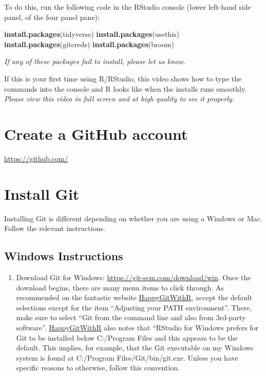 \documentclass[
]{book}
\newenvironment{Shaded}{\begin{snugshade}}{\end{snugshade}}
\newcommand{\FunctionTok}[1]{\textcolor[rgb]{0.13,0.29,0.53}{\textbf{#1}}}
\newcommand{\NormalTok}[1]{#1}
\newcommand{\StringTok}[1]{\textcolor[rgb]{0.31,0.60,0.02}{#1}}
\providecommand{\tightlist}{%
  \setlength{\itemsep}{0pt}\setlength{\parskip}{0pt}}
\begin{document}
To do this, run the following code in the RStudio console (lower left-hand side
panel, of the four panel pane):

\begin{Shaded}
\begin{Highlighting}[]
\FunctionTok{install.packages}\NormalTok{(}\StringTok{\textquotesingle{}tidyverse\textquotesingle{}}\NormalTok{)}
\FunctionTok{install.packages}\NormalTok{(}\StringTok{\textquotesingle{}usethis\textquotesingle{}}\NormalTok{)}
\FunctionTok{install.packages}\NormalTok{(}\StringTok{\textquotesingle{}gitcreds\textquotesingle{}}\NormalTok{)}
\FunctionTok{install.packages}\NormalTok{(}\StringTok{\textquotesingle{}broom\textquotesingle{}}\NormalTok{)}
\end{Highlighting}
\end{Shaded}

\emph{If any of these packages fail to install, please let us know.}

If this is your first time using R/RStudio, this video shows how to type the
commands into the console and R looks like when the installs runs smoothly.
\emph{Please view this video in full screen and at high quality to see it properly.}

\section{Create a GitHub account}\label{create-a-github-account}

\url{https://github.com/}

\section{Install Git}\label{install-git}

Installing Git is different depending on whether you are using a Windows or Mac.
Follow the relevant instructions.

\subsection{Windows Instructions}\label{windows-instructions}

\begin{enumerate}
\def\labelenumi{\arabic{enumi})}
\tightlist
\item
  Download Git for Windows: \url{https://git-scm.com/download/win}. Once the download
  begins, there are many menu items to click through. As recommended on the
  fantastic website \href{https://happygitwithr.com/install-git}{HappyGitWithR}, accept
  the default selections except for the item ``Adjusting your PATH environment''.
  There, make sure to select ``Git from the command line and also from 3rd-party
  software''. \href{https://happygitwithr.com/install-git}{HappyGitWithR} also notes
  that ``RStudio for Windows prefers for Git to
  be installed below C:/Program Files and this appears to be the default. This
  implies, for example, that the Git executable on my Windows system is found at
  C:/Program Files/Git/bin/git.exe. Unless you have specific reasons to otherwise,
  follow this convention.
\end{enumerate}
\end{document}
